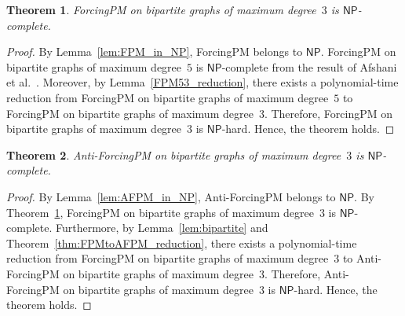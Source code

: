 \documentclass[a4paper,10pt]{article}
\newtheorem{theorem}{Theorem}
\newcommand{\NP}{$\mathsf{NP}$}
\newcommand{\NPc}{$\mathsf{NP}$-complete}
\newcommand{\NPh}{$\mathsf{NP}$-hard}
\newcommand{\FPM}{\sc ForcingPM} %
\newcommand{\AFPM}{\sc Anti-ForcingPM}
\begin{document}
\begin{theorem}\label{FPM_NPc}
    {\FPM} on bipartite graphs of maximum degree~$3$ is {\NPc}.
\end{theorem}

\begin{proof}
    By Lemma~\ref{lem:FPM_in_NP}, {\FPM} belongs to {\NP}.
    {\FPM} on bipartite graphs of maximum degree~$5$ is {\NPc} from the result of Afshani et al.~\cite{afshani2009spectrum}.
    Moreover, by Lemma~\ref{FPM53_reduction}, there exists a polynomial-time reduction from {\FPM} on bipartite graphs of maximum degree~$5$ to {\FPM} on bipartite graphs of maximum degree~$3$.
    Therefore, {\FPM} on bipartite graphs of maximum degree~$3$ is {\NPh}.
    Hence, the theorem holds.
\end{proof}

\begin{theorem}\label{AFPM_NPc}
    {\AFPM} on bipartite graphs of maximum degree~$3$ is {\NPc}.
\end{theorem}

\begin{proof}
    By Lemma~\ref{lem:AFPM_in_NP}, {\AFPM} belongs to {\NP}.
    By Theorem~\ref{FPM_NPc}, {\FPM} on bipartite graphs of maximum degree~$3$ is {\NPc}.
    Furthermore, by Lemma~\ref{lem:bipartite} and Theorem~\ref{thm:FPMtoAFPM_reduction}, there exists a polynomial-time reduction from {\FPM} on bipartite graphs of maximum degree~$3$ to {\AFPM} on bipartite graphs of maximum degree~$3$.
    Therefore, {\AFPM} on bipartite graphs of maximum degree~$3$ is {\NPh}.
    Hence, the theorem holds.
\end{proof}



\end{document}
